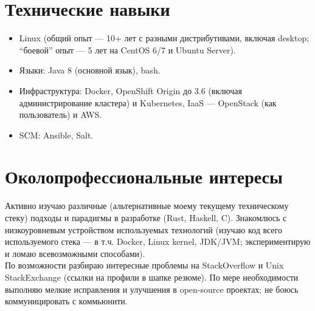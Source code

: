 \documentclass[letterpaper, 11pt]{article}
\begin{document}
    \renewcommand{\labelitemi}{\textbullet}





    \section{Технические навыки}

    \begin{itemize}
        \item Linux (общий опыт --- 10+ лет с разными дистрибутивами, включая desktop; ``боевой'' опыт --- 5 лет на CentOS 6/7 и Ubuntu Server).
        \item Языки: Java 8 (основной язык), bash.
        \item Инфраструктура: Docker, OpenShift Origin до 3.6 (включая администрирование кластера) и Kubernetes, IaaS --- OpenStack (как пользователь) и AWS.
        \item SCM: Ansible, Salt.
    \end{itemize}





    \section{Околопрофессиональные интересы}

    Активно изучаю различные (альтернативные моему текущему техническому стеку) подходы и парадигмы в разработке (Rust, Haskell, C). Знакомлюсь с низкоуровневым устройством используемых технологий (изучаю код всего используемого стека --- в т.ч. Docker, Linux kernel, JDK/JVM; экспериментирую и ломаю всевозможными способами). \\

    \noindent
    По возможности разбираю интересные проблемы на StackOverflow и Unix StackExchange (ссылки на профили в шапке резюме). По мере необходимости выполняю мелкие исправления и улучшения в open-source проектах; не боюсь коммуницировать с коммьюнити.
\end{document}

